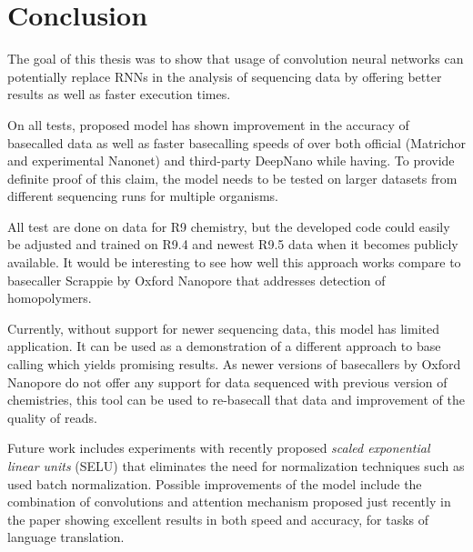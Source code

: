\documentclass[times, utf8, diplomski, numeric, english]{fer}
\begin{document}
\chapter{Conclusion}



The goal of this thesis was to show that usage of convolution neural networks can potentially replace RNNs in the analysis of sequencing data by offering better results as well as faster execution times.

On all tests, proposed model has shown improvement in the accuracy of basecalled data as well as faster basecalling speeds of over both official (Matrichor and experimental Nanonet) and  third-party DeepNano while having. 
To provide definite proof of this claim, the model needs to be tested on larger datasets from different sequencing runs for multiple organisms.

All test are done on data for R9 chemistry, but the developed code could easily be adjusted and trained on R9.4 and newest R9.5 data when it becomes publicly available.
It would be interesting to see how well this approach works compare to basecaller Scrappie by Oxford Nanopore that addresses detection of homopolymers.

Currently, without support for newer sequencing data, this model has limited application. 
It can be used as a demonstration of a different approach to base calling which yields promising results.  As newer versions of basecallers by Oxford Nanopore do not offer any support for data sequenced with previous version of chemistries, this tool can be used to re-basecall that data and improvement of the quality of reads.

Future work includes experiments with recently proposed \textit{scaled exponential linear units} (SELU) \cite{selu} that eliminates the need for normalization techniques such as used batch normalization. Possible improvements of the model include the combination of convolutions and attention mechanism proposed just recently in the paper \cite{facebook} showing excellent results in both speed and accuracy, for tasks of language translation. 
\end{document}
